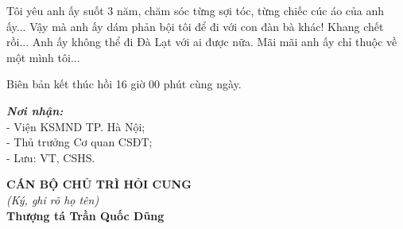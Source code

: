 \documentclass[12pt,a4paper]{article}
\begin{document}
Tôi yêu anh ấy suốt 3 năm, chăm sóc từng sợi tóc, từng chiếc cúc áo của anh ấy... Vậy mà anh ấy dám phản bội tôi để đi với con đàn bà khác! Khang chết rồi... Anh ấy không thể đi Đà Lạt với ai được nữa. Mãi mãi anh ấy chỉ thuộc về một mình tôi...

\vspace{0.6cm}
\noindent Biên bản kết thúc hồi 16 giờ 00 phút cùng ngày.

\vspace{0.8cm}

\noindent
\begin{minipage}[t]{0.45\textwidth}
    \small
    \textbf{\textit{Nơi nhận:}}\\
    - Viện KSMND TP. Hà Nội;\\
    - Thủ trưởng Cơ quan CSĐT;\\
    - Lưu: VT, CSHS.
\end{minipage}
\hfill
\begin{minipage}[t]{0.5\textwidth}
    \begin{center}
        \small
        \textbf{CÁN BỘ CHỦ TRÌ HỎI CUNG}\\
        \textit{(Ký, ghi rõ họ tên)}\\[1.5cm]
        \textbf{Thượng tá Trần Quốc Dũng}
    \end{center}
\end{minipage}
\end{document}
